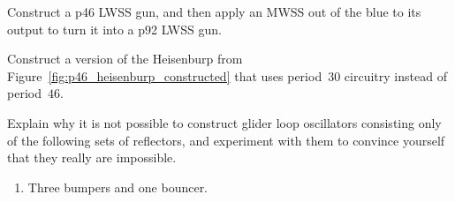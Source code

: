 \begin{multicols}{2}
	
	\begin{problem}\label{exer:mwss_out_of_blue_double_period} 
		Construct a p46 LWSS gun, and then apply an MWSS out of the blue to its output to turn it into a p92 LWSS gun.
		
	\end{problem}
	
	
	\mfilbreak
	

	\begin{problem}\label{exer:construct_p30_heisenburp} 
		Construct a version of the Heisenburp from Figure~\ref{fig:p46_heisenburp_constructed} that uses period~$30$ circuitry instead of period~$46$.
	\end{problem}
	
	
	\mfilbreak
	
	
	\begin{problemstar}\label{exer:bumper_bouncer_wrong_color} 
		Explain why it is not possible to construct glider loop oscillators consisting only of the following sets of reflectors, and experiment with them to convince yourself that they really are impossible.\smallskip
		
		\begin{enumerate}[label=\bf\color{ocre}(\alph*)]
			\item Three bumpers and one bouncer.
			

\end{enumerate}
\end{problemstar}
\end{multicols}
